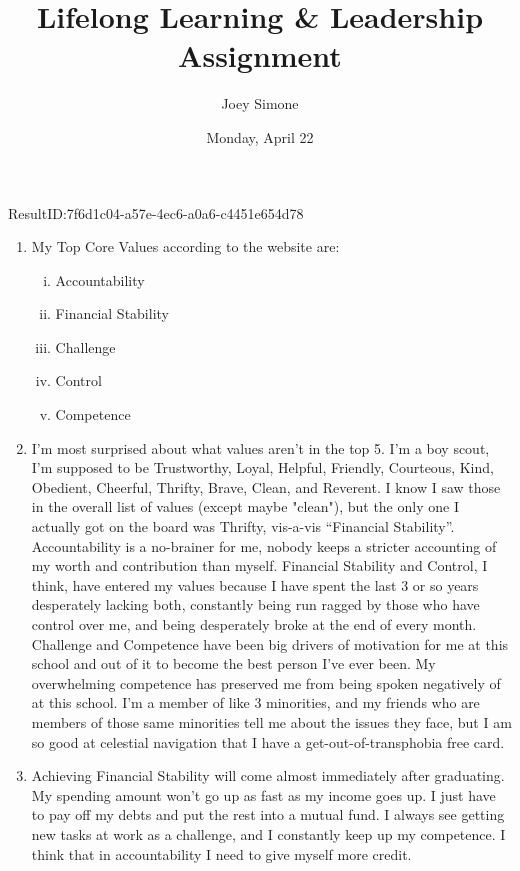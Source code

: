 \documentclass{article}[letterpaper,12pt]
\author{Joey Simone}
\title{Lifelong Learning \& Leadership Assignment}
\date{Monday, April 22}
\begin{document}
\maketitle
\begin{verbatim*}
	ResultID:7f6d1c04-a57e-4ec6-a0a6-c4451e654d78
\end{verbatim*}
\begin{enumerate}
	\item My Top Core Values according to the website are\parencite{noauthor_your_nodate}: 
		\begin{enumerate}[i.]
			\item Accountability
			\item Financial Stability
			\item Challenge
			\item Control
			\item Competence
		\end{enumerate}
	\item I'm most surprised about what values aren't in the top 5. I'm a boy scout, I'm supposed to be Trustworthy, Loyal, Helpful, Friendly, Courteous, Kind, Obedient, Cheerful, Thrifty, Brave, Clean, and Reverent. I know I saw those in the overall list of values (except maybe "clean"), but the only one I actually got on the board was Thrifty, vis-a-vis ``Financial Stability''. Accountability is a no-brainer for me, nobody keeps a stricter accounting of my worth and contribution than myself. Financial Stability and Control, I think, have entered my values because I have spent the last 3 or so years desperately lacking both, constantly being run ragged by those who have control over me, and being desperately broke at the end of every month. Challenge and Competence have been big drivers of motivation for me at this school and out of it to become the best person I've ever been. My overwhelming competence has preserved me from being spoken negatively of at this school. I'm a member of like 3 minorities, and my friends who are members of those same minorities tell me about the issues they face, but I am so good at celestial navigation that I have a get-out-of-transphobia free card.
	\item Achieving Financial Stability will come almost immediately after graduating. My spending amount won't go up as fast as my income goes up. I just have to pay off my debts and put the rest into a mutual fund. I always see getting new tasks at work as a challenge, and I constantly keep up my competence. I think that in accountability I need to give myself more credit.

\end{enumerate}
\end{document}
